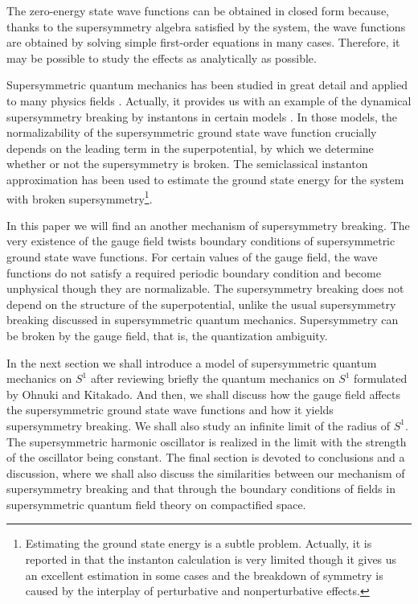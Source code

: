 \documentclass[a4paper,12pt]{article}
\begin{document}
The zero-energy state wave functions can be obtained in closed form 
\cite{claud} because, thanks to the 
supersymmetry algebra satisfied by the system, the wave functions are  
obtained by solving simple first-order equations in many cases. 
Therefore, it may be possible to study 
the effects as analytically as possible.   
\par
Supersymmetric quantum mechanics has been studied in great 
detail and applied to many physics fields \cite{cooper}. Actually, it 
provides us with an example of the dynamical supersymmetry 
breaking by instantons
in certain models \cite{witten}\cite{holton}\cite{freedman}\cite{khare}.  
In those models, the normalizability of the supersymmetric ground state 
wave function crucially depends on the leading term in the 
superpotential, by which we determine whether or not 
the supersymmetry is broken. The semiclassical 
instanton approximation has been used to estimate
the ground state energy for the system with broken 
supersymmetry\footnote{Estimating the ground state energy is a subtle problem.
Actually, it is reported in \cite{abbott1}\cite{abbott2} that the instanton 
calculation is very limited though it gives us an excellent estimation 
in some cases and the 
breakdown of symmetry is caused by the interplay of perturbative 
and nonperturbative effects.}.
\par
In this paper we will find an another mechanism 
of supersymmetry breaking. The very existence of the gauge field twists
boundary conditions of supersymmetric ground state wave functions.
For certain values of the gauge field, the wave functions do not satisfy
a required periodic boundary condition and become
unphysical though they are normalizable. 
The supersymmetry breaking does not depend on the 
structure of the superpotential, unlike the usual
supersymmetry breaking discussed in supersymmetric quantum mechanics. 
Supersymmetry can be broken by the
gauge field, that is, the quantization ambiguity. 
\par
In the next section we shall introduce a model of supersymmetric 
quantum mechanics on $S^1$ after reviewing briefly the 
quantum mechanics on $S^1$
formulated by Ohnuki and Kitakado.  And then, we shall 
discuss how the gauge field affects the supersymmetric ground state wave 
functions and how it yields supersymmetry breaking. 
We shall also study an infinite limit of the radius of $S^1$. 
The supersymmetric
harmonic oscillator is realized in the limit with the 
strength of the oscillator being constant. 
The final section is devoted to conclusions and a discussion, where 
we shall also discuss the similarities between our mechanism of  
supersymmetry breaking and that through the boundary conditions 
of fields in supersymmetric quantum field theory on compactified 
space.
\end{document}
